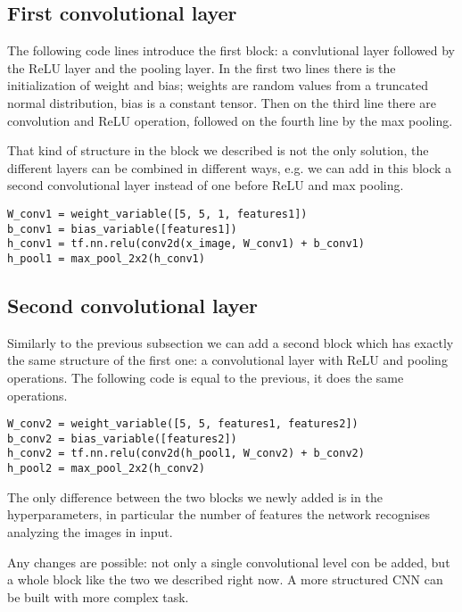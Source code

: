 \subsection{First convolutional layer}

The following code lines introduce the first block: a convlutional layer followed by the ReLU layer and the pooling layer. In the first two lines there is the initialization of weight and bias; weights are random values from a truncated normal distribution, bias is a constant tensor. Then on the third line there are convolution and ReLU operation, followed on the fourth line by the max pooling.

That kind of structure in the block we described is not the only solution, the different layers can be combined in different ways, e.g. we can add in this block a second convolutional layer instead of one before ReLU and max pooling.

\begin{lstlisting}
W_conv1 = weight_variable([5, 5, 1, features1])
b_conv1 = bias_variable([features1])
h_conv1 = tf.nn.relu(conv2d(x_image, W_conv1) + b_conv1)
h_pool1 = max_pool_2x2(h_conv1)
\end{lstlisting}

\subsection{Second convolutional layer}

Similarly to the previous subsection we can add a second block which has exactly the same structure of the first one: a convolutional layer with ReLU and pooling operations. The following code is equal to the previous, it does the same operations.

\begin{lstlisting}
W_conv2 = weight_variable([5, 5, features1, features2])
b_conv2 = bias_variable([features2])
h_conv2 = tf.nn.relu(conv2d(h_pool1, W_conv2) + b_conv2)
h_pool2 = max_pool_2x2(h_conv2)
\end{lstlisting}

The only difference between the two blocks we newly added is in the hyperparameters, in particular the number of features the network recognises analyzing the images in input.

Any changes are possible: not only a single convolutional level con be added, but a whole block like the two we described right now. A more structured \acs{CNN} can be built with more complex task.

